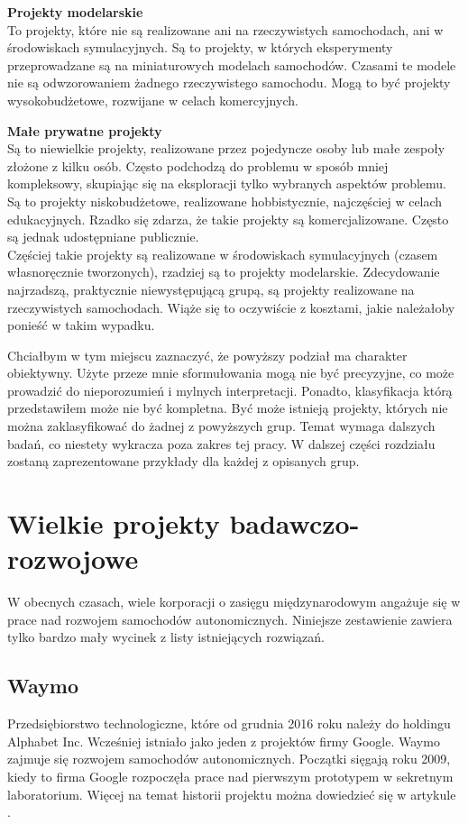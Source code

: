 \begin{enumerate*}
\item \textbf{Projekty modelarskie} \\
To projekty, które nie są realizowane ani na rzeczywistych samochodach, ani w środowiskach symulacyjnych. Są to projekty, w których eksperymenty przeprowadzane są na miniaturowych modelach samochodów. Czasami te modele nie są odwzorowaniem żadnego rzeczywistego samochodu. Mogą to być projekty wysokobudżetowe, rozwijane w celach komercyjnych. \\

\item \textbf{Małe prywatne projekty} \\
Są to niewielkie projekty, realizowane przez pojedyncze osoby lub małe zespoły złożone z kilku osób. Często podchodzą do problemu w sposób mniej kompleksowy, skupiając się na eksploracji tylko wybranych aspektów problemu. Są to projekty niskobudżetowe, realizowane hobbistycznie, najczęściej w celach edukacyjnych. Rzadko się zdarza, że takie projekty są komercjalizowane. Często są jednak udostępniane publicznie. \\
Częściej takie projekty są realizowane w środowiskach symulacyjnych (czasem własnoręcznie tworzonych), rzadziej są to projekty modelarskie. Zdecydowanie najrzadszą, praktycznie niewystępującą grupą, są projekty realizowane na rzeczywistych samochodach. Wiąże się to oczywiście z kosztami, jakie należałoby ponieść w takim wypadku.
\end{enumerate*}

\newpage
Chciałbym w tym miejscu zaznaczyć, że powyższy podział ma charakter obiektywny. 
Użyte przeze mnie sformułowania mogą nie być precyzyjne, co może prowadzić do nieporozumień i mylnych interpretacji.
Ponadto, klasyfikacja którą przedstawiłem może nie być kompletna. Być może istnieją projekty, których nie można zaklasyfikować do żadnej z powyższych grup. Temat wymaga dalszych badań, co niestety wykracza poza zakres tej pracy. W dalszej części rozdziału zostaną zaprezentowane przykłady dla każdej z opisanych grup. 

\section{Wielkie projekty badawczo-rozwojowe}
W obecnych czasach, wiele korporacji o zasięgu międzynarodowym angażuje się w prace nad rozwojem samochodów autonomicznych. 
Niniejsze zestawienie zawiera tylko bardzo mały wycinek z listy istniejących rozwiązań.

\subsection{Waymo}
Przedsiębiorstwo technologiczne, które od grudnia 2016 roku należy do holdingu Alphabet Inc. Wcześniej istniało jako jeden z projektów firmy Google. Waymo zajmuje się rozwojem samochodów autonomicznych. Początki sięgają roku 2009, kiedy to firma Google rozpoczęła prace nad pierwszym prototypem w sekretnym laboratorium. Więcej na temat historii projektu można dowiedzieć się w artykule \cite{google:carHistory}.


